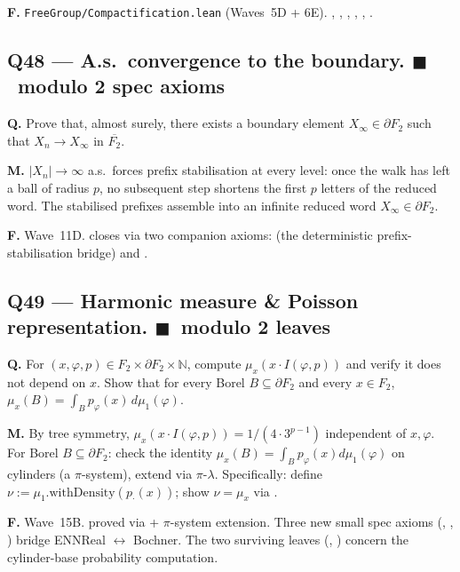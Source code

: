 \documentclass[11pt,a4paper]{article}
\newcommand{\done}[1]{\textcolor{donegreen}{\textbf{#1}}}
\newcommand{\lmod}[1]{\texttt{\small #1}}
\newcommand{\N}{\mathbb{N}}
\newcommand{\BFG}{\partial F_2}
\theoremstyle{plain}
\theoremstyle{definition}
\begin{document}
\textbf{F.} \lmod{FreeGroup/Compactification.lean} (Waves~5D + 6E).
, ,
, ,
,
.

\subsection{Q48 --- A.s.\ convergence to the boundary. \done{$\blacksquare$}{\normalfont\ modulo 2 spec axioms}}

\textbf{Q.} Prove that, almost surely, there exists a boundary
element $X_\infty \in \partial F_2$ such that $X_n \to X_\infty$
in $\overline{F_2}$.

\textbf{M.} $|X_n| \to \infty$ a.s.\ forces prefix stabilisation at
every level: once the walk has left a ball of radius $p$, no
subsequent step shortens the first $p$ letters of the reduced
word. The stabilised prefixes assemble into an infinite reduced
word $X_\infty \in \BFG$.

\textbf{F.} Wave~11D.  closes
via two companion axioms:
 (the deterministic
prefix-stabilisation bridge) and .

\subsection{Q49 --- Harmonic measure \& Poisson representation. \done{$\blacksquare$}{\normalfont\ modulo 2 leaves}}

\textbf{Q.} For $(x, \varphi, p) \in F_2 \times \partial F_2 \times \N$,
compute $\mu_x(x \cdot I(\varphi, p))$ and verify it does not depend
on $x$. Show that for every Borel $B \subseteq \partial F_2$ and
every $x \in F_2$,
$\mu_x(B) = \int_B p_\varphi(x)\,d\mu_1(\varphi)$.

\textbf{M.} By tree symmetry, $\mu_x(x \cdot I(\varphi, p)) =
1/(4 \cdot 3^{p-1})$ independent of $x, \varphi$. For Borel
$B \subseteq \BFG$: check the identity $\mu_x(B) = \int_B p_\varphi(x)
d\mu_1(\varphi)$ on cylinders (a $\pi$-system), extend via
$\pi$-$\lambda$. Specifically: define $\nu := \mu_1.\text{withDensity}(p_\cdot(x))$;
show $\nu = \mu_x$ via
.

\textbf{F.} Wave~15B.
 proved via
 + $\pi$-system extension. Three new small
spec axioms (,
, )
bridge ENNReal $\leftrightarrow$ Bochner. The two surviving leaves
(,
) concern the
cylinder-base probability computation.
\end{document}

